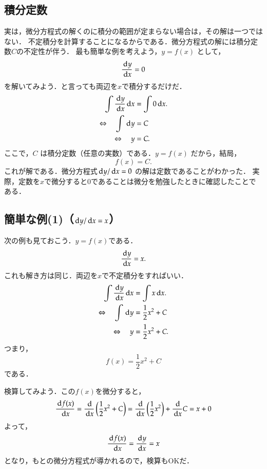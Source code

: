             \subsection{積分定数}
                実は，微分方程式の解くのに積分の範囲が定まらない場合は，その解は一つではない．
                不定積分を計算することになるからである．微分方程式の解には積分定数$C$の不定性が伴う．
                最も簡単な例を考えよう，$y=f(x)$ として，
                    \[
                        \frac{\,\mathrm{d} y}{\,\mathrm{d} x} = 0
                    \]
                を解いてみよう．と言っても両辺を$x$で積分するだけだ．
                    \begin{align*}
                        \int \frac{\,\mathrm{d} y}{\,\mathrm{d} x} \,\mathrm{d} x &= \int 0 \,\mathrm{d} x. \\
                        \Leftrightarrow \quad
                        \int \,\mathrm{d} y &= C \\
                        \Leftrightarrow \quad
                        y &= C.
                    \end{align*}
                ここで，$C$ は積分定数（任意の実数）である．$y=f(x)$ だから，結局，
                    \[
                        f(x) = C.
                    \]
                これが解である．微分方程式$\,\mathrm{d} y/\,\mathrm{d} x = 0$ の解は定数であることがわかった．
                実際，定数を$x$で微分すると0であることは微分を勉強したときに確認したことである．

            \subsection{簡単な例(1)（$\,\mathrm{d} y/\,\mathrm{d} x = x$）}
                次の例も見ておこう．$y=f(x)$である．
                \[
                    \frac{\,\mathrm{d} y}{\,\mathrm{d} x} = x.
                \]
                これも解き方は同じ．両辺を$x$で不定積分をすればいい．
                \begin{align*}
                    \int \frac{\,\mathrm{d} y}{\,\mathrm{d} x} \,\mathrm{d} x &= \int x \,\mathrm{d} x. \\
                    \Leftrightarrow \quad
                    \int \,\mathrm{d} y &= \frac{1}{2} {x}^{2} + C \\
                    \Leftrightarrow \quad
                    y &= \frac{1}{2} {x}^{2} + C.
                \end{align*}
                つまり，
                \[
                    f(x) = \frac{1}{2} {x}^{2} + C
                \]
                である．
                
                検算してみよう．この$f(x)$を微分すると，
                \[
                    \frac{\,\mathrm{d} f(x)}{\,\mathrm{d} x} = \frac{\,\mathrm{d} }{\,\mathrm{d} x}\left( \frac{1}{2} {x}^{2} + C \right)
                    = \frac{\,\mathrm{d} }{\,\mathrm{d} x}\left( \frac{1}{2} {x}^{2}\right) + \frac{\,\mathrm{d} }{\,\mathrm{d} x} C
                    = x + 0
                \]
                よって，
                \[
                    \frac{\,\mathrm{d} f(x)}{\,\mathrm{d} x} = \frac{\,\mathrm{d} y}{\,\mathrm{d} x} = x
                \]
                となり，もとの微分方程式が導かれるので，検算もOKだ．

